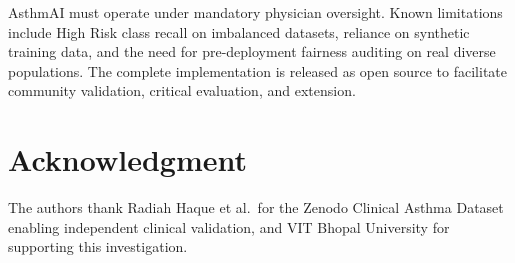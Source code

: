 \documentclass[11pt,a4paper]{article}
\begin{document}
AsthmAI must operate under mandatory physician oversight. Known limitations include
High Risk class recall on imbalanced datasets, reliance on synthetic training data,
and the need for pre-deployment fairness auditing on real diverse populations.
The complete implementation is released as open source to facilitate community
validation, critical evaluation, and extension.

\section*{Acknowledgment}

The authors thank Radiah Haque et al.\ for the Zenodo Clinical Asthma Dataset enabling
independent clinical validation, and VIT Bhopal University for supporting this
investigation.
\end{document}

